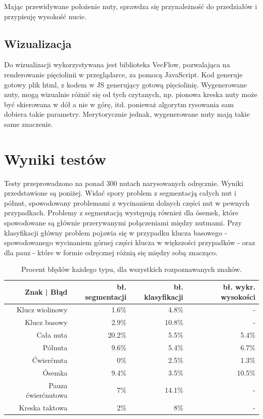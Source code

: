 \documentclass[a4paper,11pt]{article}
\begin{document}
Mając przewidywane położenie nuty, sprawdza się przynależność do przedziałów i przypisuję wysokość nucie.

\subsection{Wizualizacja}
Do wizualizacji wykorzystywana jest biblioteka VecFlow, pozwalająca na renderowanie pięciolinii w przeglądarce, za pomocą JavaScript.
Kod generuje gotowy plik html, z kodem w JS generujący gotową pięciolinię.
Wygenerowane nuty, mogą wizualnie różnić się od tych czytanych,
np. pionowa kreska nuty może być skierowana w dół a nie w górę, itd. ponieważ algorytm rysowania sam dobiera takie parametry.
Merytorycznie jednak, wygenerowane nuty mają takie same znaczenie.

\section{Wyniki testów}
Testy przeprowadzono na ponad 300 nutach narysowanych odręcznie. Wyniki przedstawione są poniżej.
Widać spory problem z segmentacją całych nut i półnut, spowodowany problemami z wycinaniem dolnych części nut w pewnych przypadkach.
Problemy z segmentacją występują również dla ósemek, które spowodowane są głównie przerywanymi połączeniami między nutmami.
Przy klasyfikacji główny problem pojawia się w przypadku klucza basowego - spowodowanego wycinaniem górnej części klucza w większości przypadków -
oraz dla pauz - które w formie odręcznej różnią się między sobą znacząco.

\begin{table}
\centering
\begin{tabular}{|r|r|r|r|}
\hline
Znak | Błąd & bł. segmentacji & bł. klasyfikacji & bł. wykr. wysokości \\ \hline
Klucz wiolinowy & 1.6\% & 4.8\% & - \\
Klucz basowy & 2.9\% & 10.8\% & - \\
Cała nuta & 20.2\% & 5.5\% & 5.4\%\\
Półnuta & 9.6\% & 5.4\% & 6.7\% \\
Ćwierćnuta & 0\% & 2.5\% & 1.3\% \\
Ósemka & 9.4\% & 3.5\% & 10.5\% \\
Pauza ćwierćnutowa & 7\% & 14.1\% & - \\
Kreska taktowa & 2\% & 8\% & - \\ \hline

\end{tabular}
\caption{Procent błędów każdego typu, dla wszystkich rozpoznawanych znaków.}
\label{tab:test_results}
\end{table}





\end{document}
